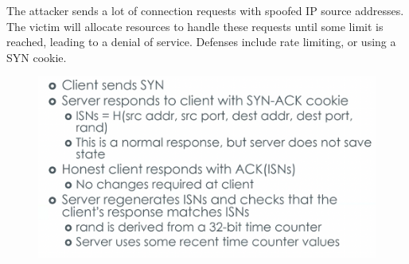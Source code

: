 \documentclass[../notes.tex]{subfiles}
\begin{document}
The attacker sends a lot of connection requests with spoofed IP source addresses. The victim will allocate resources to handle these requests until some limit is reached, leading to a denial of service.
Defenses include rate limiting, or using a SYN cookie.

\begin{figure}[H]
    \centering
    \includegraphics[width=0.8\linewidth]{img/image_2023-03-28-17-02-16.png}
\end{figure}


\end{document}
